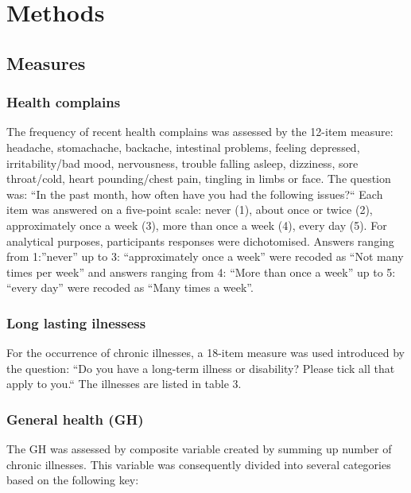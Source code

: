 \documentclass[ijerph,article,accept,moreauthors,pdftex]{mdpi}
\begin{document}
\hypertarget{methods}{%
\section{Methods}\label{methods}}

\hypertarget{measures}{%
\subsection{Measures}\label{measures}}

\hypertarget{health-complains}{%
\subsubsection{Health complains}\label{health-complains}}

The frequency of recent health complains was assessed by the 12-item
measure: headache, stomachache, backache, intestinal problems, feeling
depressed, irritability/bad mood, nervousness, trouble falling asleep,
dizziness, sore throat/cold, heart pounding/chest pain, tingling in
limbs or face. The question was: ``In the past month, how often have you
had the following issues?{}`` Each item was answered on a five-point
scale: never (1), about once or twice (2), approximately once a week
(3), more than once a week (4), every day (5). For analytical purposes,
participants responses were dichotomised. Answers ranging from
1:''never'' up to 3: ``approximately once a week'' were recoded as ``Not
many times per week'' and answers ranging from 4: ``More than once a
week'' up to 5: ``every day'' were recoded as ``Many times a week''.

\hypertarget{long-lasting-ilnessess}{%
\subsubsection{Long lasting ilnessess}\label{long-lasting-ilnessess}}

For the occurrence of chronic illnesses, a 18-item measure was used
introduced by the question: ``Do you have a long-term illness or
disability? Please tick all that apply to you.`` The illnesses are
listed in table 3.

\hypertarget{general-health-gh}{%
\subsubsection{General health (GH)}\label{general-health-gh}}

The GH was assessed by composite variable created by summing up number
of chronic illnesses. This variable was consequently divided into
several categories based on the following key:
\end{document}
